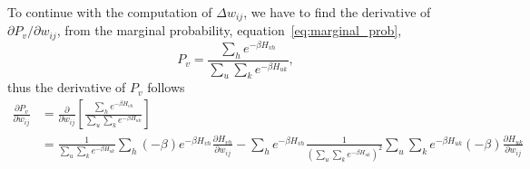 To continue with the computation of $\Delta w_{ij}$, we have to find the derivative of $\partial P_{v}/\partial w_{ij}$, from the marginal probability, equation~\ref{eq:marginal_prob}, 
\begin{equation}
  P_{v} = \frac{\sum_{h} e^{-\beta H_{v h}}}{\sum_{u} \sum_{k} e^{-\beta H_{u k}}},
  \label{eq:marginal_prob_expansion}
\end{equation}
thus the derivative of $P_{v}$ follows
\begin{equation}
  \begin{split}
    \frac{\partial P_{v}}{\partial w_{ij}} & = \frac{\partial}{\partial w_{ij}} \left[ \frac{\sum_{h} e^{-\beta H_{v h}}}{\sum_{u} \sum_{k} e^{-\beta H_{u k}}} \right] \\
    & = \frac{1}{\sum_{u} \sum_{k} e^{-\beta H_{u k}}} \sum_{h} (-\beta) e^{-\beta H_{v h}} \frac{\partial H_{v h}}{\partial w_{ij}} - \sum_{h} e^{-\beta H_{v h}} \frac{1}{\left( \sum_{u} \sum_{k} e^{-\beta H_{u k}} \right)^{2}} \sum_{u} \sum_{k} e^{-\beta H_{u k}} (-\beta) \frac{\partial H_{u k}}{\partial w_{ij}}
  \end{split}
  \label{eq:eq14}
\end{equation}


